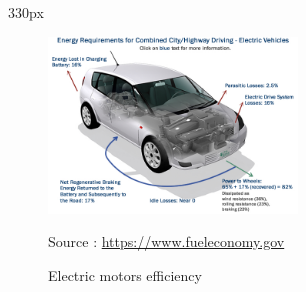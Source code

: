 \begin{frame}
\begin{center}
\begin{columns}
\begin{column}{330px}
{
    \begin{figure}[h!]
        \centering
        \includegraphics[width=250px]
            {images/efficiency-electric-motors.jpg}
        \vspace{-0.5em}
        \caption{Electric motors efficiency}
        \vspace{-0.3em}
        \scriptsize{Source :
            \url{https://www.fueleconomy.gov}}
    \end{figure}
}
\end{column}
\end{columns}
\end{center}
\end{frame}


